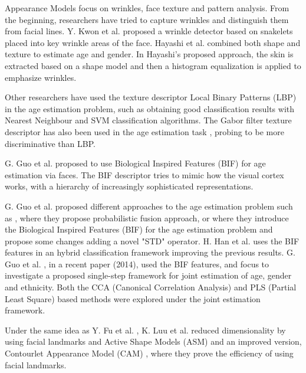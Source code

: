 Appearance Models focus on wrinkles, face texture and pattern analysis. From the beginning, researchers have tried to capture wrinkles and distinguish them from facial lines. Y. Kwon et al. \cite{Kwon:1999:ACF:311844.311845} proposed a wrinkle detector based on snakelets \cite{Kass88snakes:active} placed into key wrinkle areas of the face. Hayashi et al. \cite{969698} \cite{1195171} \cite{conf/icpr/HayashiYIK02} combined both shape and texture to estimate age and gender. In Hayashi's proposed approach, the skin is extracted based on a shape model and then a histogram equalization is applied to emphasize wrinkles.

Other researchers have used the texture descriptor Local Binary Patterns (LBP) \cite{Ahonen:2006:FDL:1175897.1176245} in the age estimation problem, such as \cite{4717926} \cite{6460367} obtaining good classification results with Nearest Neighbour and SVM classification algorithms. The Gabor \cite{Liu:2002:GFB:2319007.2320264} filter texture descriptor has also been used in the age estimation task  \cite{Gao:2009:FAC:1567988.1568003}, probing to be more discriminative than LBP.

G. Guo et al. \cite{conf/cvpr/GuoMFH09} proposed to use Biological Inspired Features (BIF) \cite{Riesenhuber99hierarchicalmodels} for age estimation via faces. The BIF descriptor tries to mimic how the visual cortex works, with a hierarchy of increasingly sophisticated representations.


G. Guo et al. proposed different approaches to the age estimation problem such as
\cite{4563041}, where they propose probabilistic fusion approach, or \cite{conf/cvpr/GuoMFH09} where they introduce the Biological Inspired Features (BIF) for the age estimation problem and propose some changes adding a novel "STD" operator. H. Han et al. \cite{han:age} uses the BIF features in an hybrid classification framework improving the previous results. G. Guo et al. \cite{Guo2014761}, in a recent paper (2014), used the BIF features, and focus to investigate a proposed single-step framework for joint estimation of age, gender and ethnicity. Both the CCA (Canonical Correlation Analysis) and PLS (Partial Least Square) based methods were explored under the joint estimation framework.

Under the same idea as Y. Fu et al. \cite{4284917}, K. Luu et al. \cite{Luu:2009:AEU:1736406.1736456, LuuSSBS11} reduced dimensionality by using facial landmarks and Active Shape Models (ASM) \cite{Luu:2009:AEU:1736406.1736456} and an improved version, Contourlet Appearance Model (CAM) \cite{LuuSSBS11}, where they prove the efficiency of using facial landmarks.

